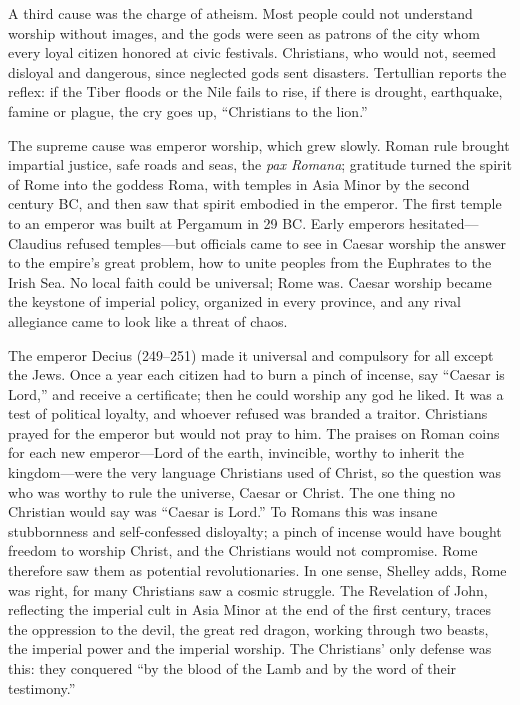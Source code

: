 A third cause was the charge of atheism. Most people could not understand worship without images, and
the gods were seen as patrons of the city whom every loyal citizen honored at civic festivals.
Christians, who would not, seemed disloyal and dangerous, since neglected gods sent disasters.
Tertullian reports the reflex: if the Tiber floods or the Nile fails to rise, if there is drought,
earthquake, famine or plague, the cry goes up, ``Christians to the lion.''

The supreme cause was emperor worship, which grew slowly. Roman rule brought impartial justice, safe
roads and seas, the \emph{pax Romana}; gratitude turned the spirit of Rome into the goddess Roma, with
temples in Asia Minor by the second century BC, and then saw that spirit embodied in the emperor. The
first temple to an emperor was built at Pergamum in 29 BC. Early emperors hesitated---Claudius
refused temples---but officials came to see in Caesar worship the answer to the empire's great
problem, how to unite peoples from the Euphrates to the Irish Sea. No local faith could be universal;
Rome was. Caesar worship became the keystone of imperial policy, organized in every province, and any
rival allegiance came to look like a threat of chaos.

The emperor Decius (249--251) made it universal and compulsory for all except the Jews. Once a year
each citizen had to burn a pinch of incense, say ``Caesar is Lord,'' and receive a certificate; then
he could worship any god he liked. It was a test of political loyalty, and whoever refused was branded
a traitor. Christians prayed for the emperor but would not pray to him. The praises on Roman coins for
each new emperor---Lord of the earth, invincible, worthy to inherit the kingdom---were the very
language Christians used of Christ, so the question was who was worthy to rule the universe, Caesar or
Christ. The one thing no Christian would say was ``Caesar is Lord.'' To Romans this was insane
stubbornness and self-confessed disloyalty; a pinch of incense would have bought freedom to worship
Christ, and the Christians would not compromise. Rome therefore saw them as potential revolutionaries.
In one sense, Shelley adds, Rome was right, for many Christians saw a cosmic struggle. The Revelation
of John, reflecting the imperial cult in Asia Minor at the end of the first century, traces the
oppression to the devil, the great red dragon, working through two beasts, the imperial power and the
imperial worship. The Christians' only defense was this: they conquered ``by the blood of the Lamb and
by the word of their testimony.''

